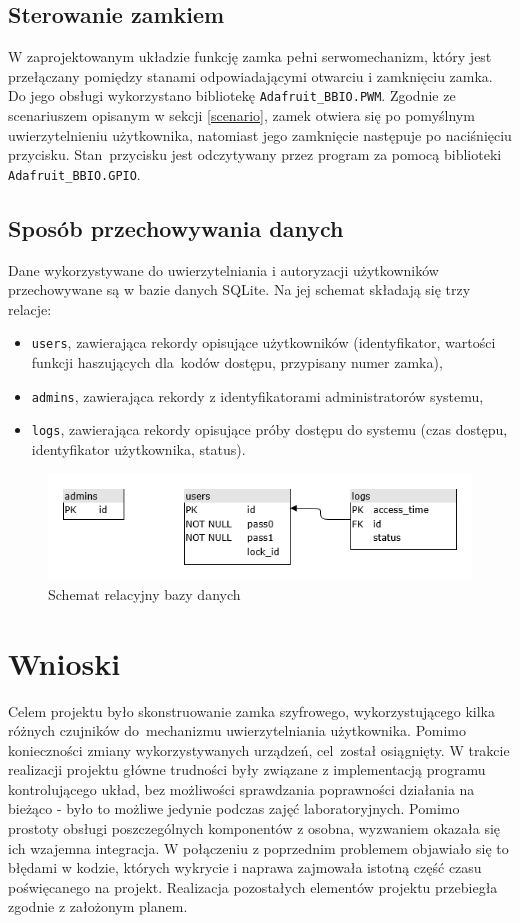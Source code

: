 \documentclass[polish,polish,a4paper]{article}
\begin{document}
	\subsection{Sterowanie zamkiem}
	W zaprojektowanym układzie funkcję zamka pełni serwomechanizm, który jest przełączany pomiędzy stanami odpowiadającymi otwarciu i zamknięciu zamka. Do jego obsługi wykorzystano bibliotekę \linebreak\verb|Adafruit_BBIO.PWM|. Zgodnie ze scenariuszem opisanym w sekcji \ref{scenario}, zamek otwiera się po pomyślnym uwierzytelnieniu użytkownika, natomiast jego zamknięcie następuje po naciśnięciu przycisku. Stan~przycisku jest odczytywany przez program za pomocą biblioteki \verb|Adafruit_BBIO.GPIO|.
	
	\subsection{Sposób przechowywania danych}
	Dane wykorzystywane do uwierzytelniania i autoryzacji użytkowników przechowywane są w bazie danych SQLite. Na jej schemat składają się trzy relacje:
	\begin{itemize}
		\item \verb|users|, zawierająca rekordy opisujące użytkowników (identyfikator, wartości funkcji haszujących dla~kodów dostępu, przypisany numer zamka),
		\item \verb|admins|, zawierająca rekordy z identyfikatorami administratorów systemu,
		\item \verb|logs|, zawierająca rekordy opisujące próby dostępu do systemu (czas dostępu, identyfikator użytkownika, status).
	\end{itemize}
	\begin{figure}[!h]
		\includegraphics[width=\textwidth]{database.png}
		\caption{Schemat relacyjny bazy danych}
	\end{figure}
	
	\section{Wnioski}
	Celem projektu było skonstruowanie zamka szyfrowego, wykorzystującego kilka różnych czujników do~mechanizmu uwierzytelniania użytkownika. Pomimo konieczności zmiany wykorzystywanych urządzeń, cel~został osiągnięty. 
	W trakcie realizacji projektu główne trudności były związane z implementacją programu kontrolującego układ, bez możliwości sprawdzania poprawności działania na bieżąco - było to możliwe jedynie podczas zajęć laboratoryjnych. Pomimo prostoty obsługi poszczególnych komponentów z osobna, wyzwaniem okazała się ich wzajemna integracja. W połączeniu z poprzednim problemem objawiało się to błędami w kodzie, których wykrycie i naprawa zajmowała istotną część czasu poświęcanego na projekt. Realizacja pozostałych elementów projektu przebiegła zgodnie z założonym planem.
	
\end{document}
